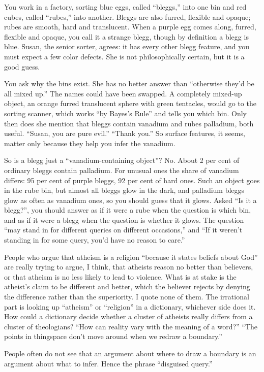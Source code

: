 
You work in a factory, sorting blue eggs, called ``bleggs,'' into one bin and red cubes, called ``rubes,'' into another. Bleggs are also furred, flexible and opaque; rubes are smooth, hard and translucent. When a purple egg comes along, furred, flexible and opaque, you call it a strange blegg, though by definition a blegg is blue. Susan, the senior sorter, agrees: it has every other blegg feature, and you must expect a few color defects. She is not philosophically certain, but it is a good guess.

You ask why the bins exist. She has no better answer than ``otherwise they'd be all mixed up.'' The names could have been swapped. A completely mixed-up object, an orange furred translucent sphere with green tentacles, would go to the sorting scanner, which works ``by Bayes's Rule'' and tells you which bin. Only then does she mention that bleggs contain vanadium and rubes palladium, both useful. ``Susan, you are pure evil.'' ``Thank you.'' So surface features, it seems, matter only because they help you infer the vanadium.

So is a blegg just a ``vanadium-containing object''? No. About 2 per cent of ordinary bleggs contain palladium. For unusual ones the share of vanadium differs: 95 per cent of purple bleggs, 92 per cent of hard ones. Such an object goes in the rube bin, but almost all bleggs glow in the dark, and palladium bleggs glow as often as vanadium ones, so you should guess that it glows. Asked ``Is it a blegg?'', you should answer as if it were a rube when the question is which bin, and as if it were a blegg when the question is whether it glows. The question ``may stand in for different queries on different occasions,'' and ``If it weren't standing in for some query, you'd have no reason to care.'' 

People who argue that atheism is a religion ``because it states beliefs about God'' are really trying to argue, I think, that atheists reason no better than believers, or that atheism is no less likely to lead to violence. What is at stake is the atheist's claim to be different and better, which the believer rejects by denying the difference rather than the superiority. I quote none of them.  The irrational part is looking up ``atheism'' or ``religion'' in a dictionary, whichever side does it. How could a dictionary decide whether a cluster of atheists really differs from a cluster of theologians? ``How can reality vary with the meaning of a word?'' ``The points in thingspace don't move around when we redraw a boundary.''

People often do not see that an argument about where to draw a boundary is an argument about what to infer. Hence the phrase ``disguised query.''
